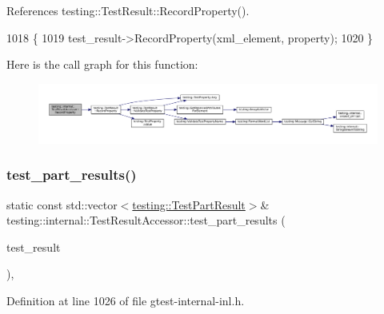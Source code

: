 References testing\+::\+Test\+Result\+::\+Record\+Property().


\begin{DoxyCode}
1018                                                            \{
1019     test\_result->RecordProperty(xml\_element, property);
1020   \}
\end{DoxyCode}
Here is the call graph for this function\+:
\nopagebreak
\begin{figure}[H]
\begin{center}
\leavevmode
\includegraphics[width=350pt]{classtesting_1_1internal_1_1TestResultAccessor_abcc4b32d1b201eeef92f0ec0ae161cf9_cgraph}
\end{center}
\end{figure}
\mbox{\label{classtesting_1_1internal_1_1TestResultAccessor_a55d771904317c1b0cc380104d175f1db}} 
\subsubsection{\texorpdfstring{test\+\_\+part\+\_\+results()}{test\_part\_results()}}
{\footnotesize\ttfamily static const std\+::vector$<$\hyperlink{classtesting_1_1TestPartResult}{testing\+::\+Test\+Part\+Result}$>$\& testing\+::internal\+::\+Test\+Result\+Accessor\+::test\+\_\+part\+\_\+results (\begin{DoxyParamCaption}\item[{const \hyperlink{classtesting_1_1TestResult}{Test\+Result} \&}]{test\+\_\+result }\end{DoxyParamCaption})\hspace{0.3cm}{\ttfamily [inline]}, {\ttfamily [static]}}



Definition at line 1026 of file gtest-\/internal-\/inl.\+h.



